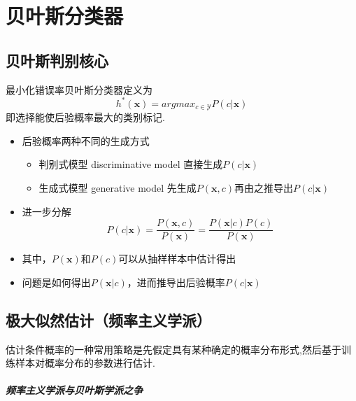 \chapter{贝叶斯分类器}


\section{贝叶斯判别核心}

最小化错误率贝叶斯分类器定义为
\begin{equation}
h^\ast(\bm x)=argmax_{c\in \mathcal Y}P(c|\bm{x})
\end{equation}
即选择能使后验概率最大的类别标记.

\begin{itemize}
\item 后验概率两种不同的生成方式
    \begin{itemize}
    \item 判别式模型 discriminative model 直接生成$P(c|\bm{x})$
    \item 生成式模型 generative model 先生成$P(\bm{x}, c)$再由之推导出$P(c|\bm{x})$
    \end{itemize}
\item 进一步分解
    \begin{equation}
    P(c|\bm{x})=\frac{P(\bm{x}, c)}{P(\bm{x})}=\frac{P(\bm{x}|c)P(c)}{P(\bm{x})}
    \end{equation}
    \item 其中，$P(\bm{x})$和$P(c)$可以从抽样样本中估计得出
    \item 问题是如何得出$P(\bm{x}|c)$，进而推导出后验概率$P(c|\bm{x})$
\end{itemize}

\section{极大似然估计（频率主义学派）}

估计条件概率的一种常用策略是先假定具有某种确定的概率分布形式,然后基于训练样本对概率分布的参数进行估计.

\paragraph{频率主义学派与贝叶斯学派之争}

